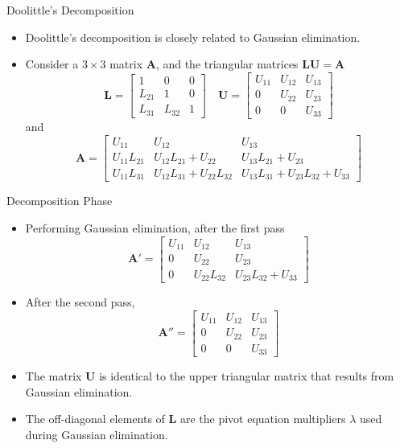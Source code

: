 \documentclass{beamer}
\begin{document}
\begin{frame}{Doolittle's Decomposition}
\begin{itemize}
\item Doolittle's decomposition is closely related to Gaussian elimination.
\item Consider a $3\times3$ matrix $\mathbf{A}$, and the triangular matrices $\mathbf{LU}=\mathbf{A}$
\[
\mathbf{L}=\left[
\begin{array}{ccc}
1 & 0 &0 \\
L_{21} & 1 & 0 \\
L_{31} & L_{32} & 1 
\end{array}\right] \quad
\mathbf{U}=\left[
\begin{array}{ccc}
U_{11} & U_{12} &U_{13} \\
0 & U_{22} & U_{23}  \\
0 & 0 & U_{33}  
\end{array}\right]
\]
and 
\[
\mathbf{A}=
\left[\begin{array}{lll}
U_{11} & U_{12} &U_{13} \\
U_{11}L_{21} & U_{12}L_{21}+U_{22} & U_{13}L_{21}+ U_{23}  \\
U_{11}L_{31} & U_{12}L_{31}+U_{22}L_{32} & U_{13}L_{31}+U_{23}L_{32}+ U_{33}
\end{array}\right]
\]
\end{itemize}
\end{frame}
\begin{frame}{Decomposition Phase}
\begin{itemize}
\item Performing  Gaussian elimination, after the first pass
\[
\mathbf{A}'=
\left[\begin{array}{ccc}
U_{11} & U_{12} &U_{13} \\
0 & U_{22} &  U_{23}  \\
0 & U_{22}L_{32} & U_{23}L_{32}+ U_{33}
\end{array}\right]
\]
\item After the second pass,
\[
\mathbf{A}''=
\left[\begin{array}{ccc}
U_{11} & U_{12} &U_{13} \\
0 & U_{22} &  U_{23}  \\
0 & 0 &  U_{33}
\end{array}\right]
\]
\item The matrix $\mathbf{U}$ is identical to the \alert{upper triangular matrix} that results from Gaussian elimination.
\item The off-diagonal elements of $\mathbf{L}$ are the pivot equation \alert{multipliers} $\lambda$ used during Gaussian elimination. 
\end{itemize}
\end{frame}
\end{document}
